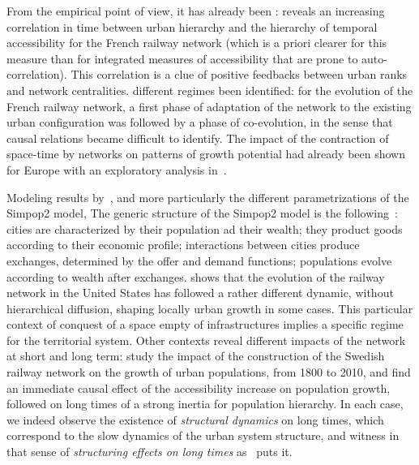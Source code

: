 From the empirical point of view, it has already been : \cite{bretagnolle2003vitesse} reveals an increasing correlation in time between urban hierarchy and the hierarchy of temporal accessibility for the French railway network (which is a priori clearer for this measure than for integrated measures of accessibility that are prone to auto-correlation). This correlation is a clue of positive feedbacks between urban ranks and network centralities.  different regimes    been identified: for the evolution of the French railway network, a first phase of adaptation of the network to the existing urban configuration was followed by a phase of co-evolution, in the sense that causal relations became difficult to identify. The impact of the contraction of space-time by networks on patterns of growth potential had already been shown for Europe with an exploratory analysis in~\citep{bretagnolle1998space}.

Modeling results by~\cite{bretagnolle2010comparer}, and more particularly the different parametrizations of the Simpop2 model,  The generic structure of the Simpop2 model is the following~\citep{pumain2008socio}: cities are characterized by their population ad their wealth; they product goods according to their economic profile; interactions between cities produce exchanges, determined by the offer and demand functions; populations evolve according to wealth after exchanges.  shows that the evolution of the railway network in the United States has followed a rather different dynamic, without hierarchical diffusion, shaping locally urban growth in some cases. This particular context of conquest of a space empty of infrastructures implies a specific regime for the territorial system. Other contexts reveal different impacts of the network at short and long term: \cite{berger2017locomotives} study the impact of the construction of the Swedish railway network on the growth of urban populations, from 1800 to 2010, and find an immediate causal effect of the accessibility increase on population growth, followed on long times of a strong inertia for population hierarchy. In each case, we indeed observe the existence of \emph{structural dynamics} on long times, which correspond to the slow dynamics of the urban system structure, and witness in that sense of \emph{structuring effects on long times} as~\cite{pumain2014effets} puts it.

